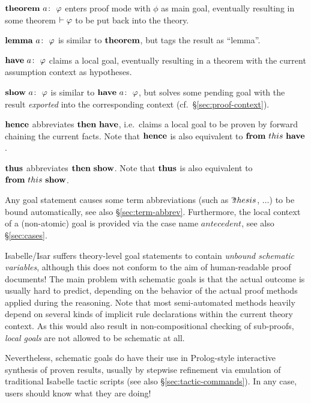\begin{descr}
\item [$\THEOREM{a}{\phi}$] enters proof mode with $\phi$ as main goal,
  eventually resulting in some theorem $\vdash \varphi$ to be put back into the
  theory.
\item [$\LEMMA{a}{\phi}$] is similar to ${\mathord{\mathbf{theorem}}}$, but tags the result as
  ``lemma''.
\item [$\HAVE{a}{\phi}$] claims a local goal, eventually resulting in a
  theorem with the current assumption context as hypotheses.
\item [$\SHOW{a}{\phi}$] is similar to $\HAVE{a}{\phi}$, but solves some
  pending goal with the result \emph{exported} into the corresponding context
  (cf.\ \S\ref{sec:proof-context}).
\item [${\mathord{\mathbf{hence}}}$] abbreviates ${\mathord{\mathbf{then}}}~{\mathord{\mathbf{have}}}$, i.e.\ claims a local goal
  to be proven by forward chaining the current facts.  Note that ${\mathord{\mathbf{hence}}}$
  is also equivalent to ${\mathord{\mathbf{from}}}~this~{\mathord{\mathbf{have}}}$.
\item [${\mathord{\mathbf{thus}}}$] abbreviates ${\mathord{\mathbf{then}}}~{\mathord{\mathbf{show}}}$.  Note that ${\mathord{\mathbf{thus}}}$ is
  also equivalent to ${\mathord{\mathbf{from}}}~this~{\mathord{\mathbf{show}}}$.
\end{descr}

Any goal statement causes some term abbreviations (such as ${?\!thesis}$,
$\dots$) to be bound automatically, see also \S\ref{sec:term-abbrev}.
Furthermore, the local context of a (non-atomic) goal is provided via the case
name $antecedent$, see also \S\ref{sec:cases}.

\medskip

\begin{warn}
  Isabelle/Isar suffers theory-level goal statements to contain \emph{unbound
    schematic variables}, although this does not conform to the aim of
  human-readable proof documents!  The main problem with schematic goals is
  that the actual outcome is usually hard to predict, depending on the
  behavior of the actual proof methods applied during the reasoning.  Note
  that most semi-automated methods heavily depend on several kinds of implicit
  rule declarations within the current theory context.  As this would also
  result in non-compositional checking of sub-proofs, \emph{local goals} are
  not allowed to be schematic at all.
  
  Nevertheless, schematic goals do have their use in Prolog-style interactive
  synthesis of proven results, usually by stepwise refinement via emulation of
  traditional Isabelle tactic scripts (see also \S\ref{sec:tactic-commands}).
  In any case, users should know what they are doing!
\end{warn}


